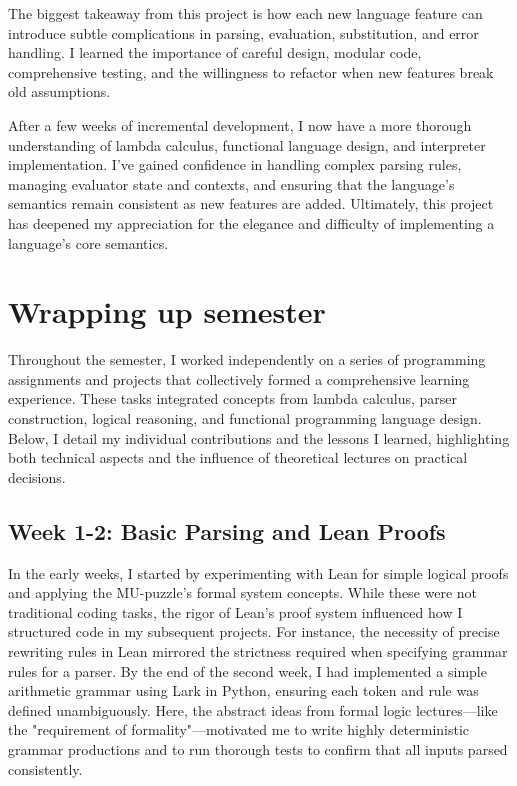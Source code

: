 \documentclass{article}
\theoremstyle{theorem}
\theoremstyle{definition}
\theoremstyle{remark}
\begin{document}
The biggest takeaway from this project is how each new language feature can introduce subtle complications in parsing, evaluation, substitution, and error handling. I learned the importance of careful design, modular code, comprehensive testing, and the willingness to refactor when new features break old assumptions.

After a few weeks of incremental development, I now have a more thorough understanding of lambda calculus, functional language design, and interpreter implementation. I’ve gained confidence in handling complex parsing rules, managing evaluator state and contexts, and ensuring that the language’s semantics remain consistent as new features are added. Ultimately, this project has deepened my appreciation for the elegance and difficulty of implementing a language’s core semantics.

\section*{Wrapping up semester}

\doublespacing

Throughout the semester, I worked independently on a series of programming assignments and projects that collectively formed a comprehensive learning experience. These tasks integrated concepts from lambda calculus, parser construction, logical reasoning, and functional programming language design. Below, I detail my individual contributions and the lessons I learned, highlighting both technical aspects and the influence of theoretical lectures on practical decisions.

\subsection*{Week 1-2: Basic Parsing and Lean Proofs}

In the early weeks, I started by experimenting with Lean for simple logical proofs and applying the MU-puzzle’s formal system concepts. While these were not traditional coding tasks, the rigor of Lean’s proof system influenced how I structured code in my subsequent projects. For instance, the necessity of precise rewriting rules in Lean mirrored the strictness required when specifying grammar rules for a parser. By the end of the second week, I had implemented a simple arithmetic grammar using Lark in Python, ensuring each token and rule was defined unambiguously. Here, the abstract ideas from formal logic lectures—like the "requirement of formality"—motivated me to write highly deterministic grammar productions and to run thorough tests to confirm that all inputs parsed consistently.
\end{document}
